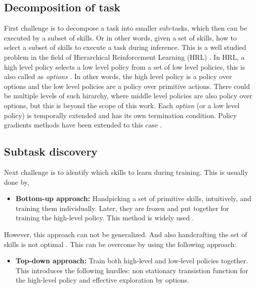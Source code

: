 \subsection{Decomposition of task}
First challenge is to decompose a task into smaller sub-tasks, which then can be executed by a subset of skills. Or in other words, given a set of skills, how to select a subset of skills to execute a task during inference. This is a well studied problem in the field of Hierarchical Reinforcement Learning (HRL) \cite{hutsebaut-buysseHierarchicalReinforcementLearning2022}. In HRL, a high level policy selects a low level policy from a set of low level policies, this is also called as \textit{options} \cite{suttonMDPsSemiMDPsFramework1999}. In other words, the high level policy is a policy over options and the low level policies are a policy over primitive actions. There could be multiple levels of such hirarchy, where middle level policies are also policy over options, but this is beyond the scope of this work. Each \textit{option} (or a low level policy) is temporally extended and has its own termination condition. Policy gradients methods have been extended to this case \cite{baconOptionCriticArchitecture2017}.

\subsection{Subtask discovery}
Next challenge is to identify which skills to learn during training. This is usually done by,

\begin{itemize}
\item \textbf{Bottom-up approach:} 
Handpicking a set of primitive skills, intuitively, and training them individually. Later, they are frozen and put together for training the high-level policy. This method is widely used \cite{pateriaHierarchicalReinforcementLearning2021}.
\end{itemize}

However, this approach can not be generalized. And also handcrafting the set of skills is not optimal \cite{silverWelcomeEraExperience}. This can be overcome by using the following approach:

\begin{itemize}
\item \textbf{Top-down approach:}
Train both high-level and low-level policies together. This introduces the following hurdles: non stationary transistion function for the high-level policy and effective exploration by options. 
\end{itemize}

